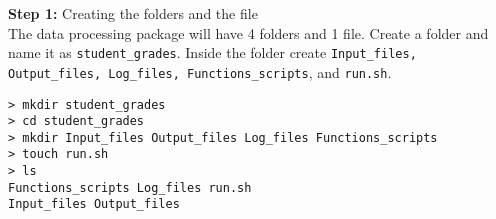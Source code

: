 \textbf{Step 1:} Creating the folders and the file \\

\noindent
The data processing package will have 4 folders and 1 file. Create a folder and name it as \texttt{student\_grades}. Inside the folder create \texttt{Input\_files, Output\_files, Log\_files, Functions\_scripts}, and \texttt{run.sh}.
\vspace{5mm}
\begin{mdframed}[hidealllines=true,backgroundcolor=gray!20]
\fontsize{10pt}{1pt}
\begin{singlespace}
\texttt{> mkdir student\_grades\\
> cd student\_grades\\
> mkdir Input\_files Output\_files Log\_files Functions\_scripts \\
> touch run.sh\\
> ls\\
Functions\_scripts\   Log\_files\   run.sh \\
Input\_files\  Output\_files\\
 }
 \end{singlespace}
\end{mdframed}


